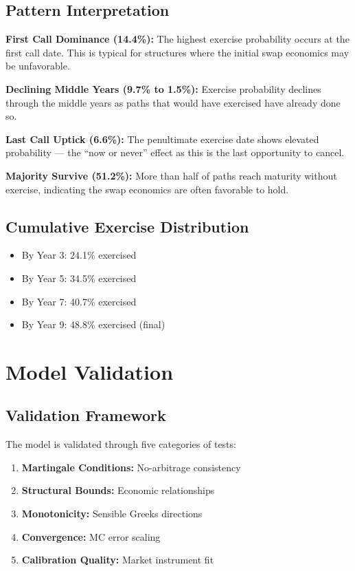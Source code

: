 \documentclass[10pt,a4paper]{article}
\begin{document}
\subsection{Pattern Interpretation}

\textbf{First Call Dominance (14.4\%):}
The highest exercise probability occurs at the first call date. This is typical for structures where the initial swap economics may be unfavorable.

\textbf{Declining Middle Years (9.7\% to 1.5\%):}
Exercise probability declines through the middle years as paths that would have exercised have already done so.

\textbf{Last Call Uptick (6.6\%):}
The penultimate exercise date shows elevated probability --- the ``now or never'' effect as this is the last opportunity to cancel.

\textbf{Majority Survive (51.2\%):}
More than half of paths reach maturity without exercise, indicating the swap economics are often favorable to hold.

\subsection{Cumulative Exercise Distribution}

\begin{itemize}
    \item By Year 3: 24.1\% exercised
    \item By Year 5: 34.5\% exercised
    \item By Year 7: 40.7\% exercised
    \item By Year 9: 48.8\% exercised (final)
\end{itemize}

\newpage

\section{Model Validation}

\subsection{Validation Framework}

The model is validated through five categories of tests:

\begin{enumerate}
    \item \textbf{Martingale Conditions:} No-arbitrage consistency
    \item \textbf{Structural Bounds:} Economic relationships
    \item \textbf{Monotonicity:} Sensible Greeks directions
    \item \textbf{Convergence:} MC error scaling
    \item \textbf{Calibration Quality:} Market instrument fit
\end{enumerate}
\end{document}
